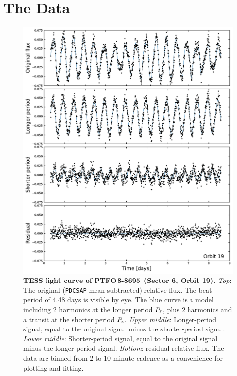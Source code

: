 \documentclass[12pt,twocolumn,tighten]{aastex62}
\newcommand{\ptfo}{PTFO$\,$8-8695}
\begin{document}
\section{The Data}
\label{sec:observations}

\begin{figure}[t!]
	\begin{center}
		\leavevmode
		\includegraphics[width=1\textwidth]{f1.pdf}
	\end{center}
	\vspace{-0.7cm}
	\caption{
    {\bf TESS light curve of \ptfo\ (Sector 6, Orbit 19).} {\it Top}:
    The original (\texttt{PDCSAP} mean-subtracted) relative flux.
    The beat period of 4.48 days is visible by eye.  The blue curve is
    a model including 2 harmonics at the longer period $P_{\rm \ell}$,
    plus 2 harmonics and a transit at the shorter period $P_{\rm s}$.
    {\it Upper middle}: Longer-period signal, equal to the original signal
    minus the shorter-period signal.  {\it Lower middle}:
    Shorter-period signal, equal to the original signal minus the
    longer-period signal.  {\it Bottom}: residual relative flux.  The
    data are binned from 2 to 10 minute cadence as a convenience for
    plotting and fitting.
		\label{fig:splitsignal}
	}
\end{figure}
\end{document}
